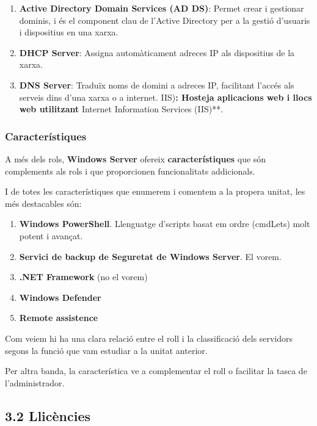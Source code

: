 \documentclass[
  a4paper,
]{article}
\begin{document}
\begin{enumerate}
\def\labelenumi{\arabic{enumi}.}
\item
  \textbf{Active Directory Domain Services (AD DS)}: Permet crear i
  gestionar dominis, i és el component clau de l'Active Directory per a
  la gestió d'usuaris i dispositius en una xarxa.
\item
  \textbf{DHCP Server}: Assigna automàticament adreces IP als
  dispositius de la xarxa.
\item
  \textbf{DNS Server}: Traduïx noms de domini a adreces IP, facilitant
  l'accés als serveis dins d'una xarxa o a internet. IIS)\textbf{:
  Hosteja aplicacions web i llocs web utilitzant }Internet Information
  Services (IIS)**.
\end{enumerate}

\subsubsection{Característiques}\label{caracteruxedstiques}

A més dels rols, \textbf{Windows Server} ofereix
\textbf{característiques} que són complements als rols i que
proporcionen funcionalitats addicionals.

I de totes les característiques que enumerem i comentem a la propera
unitat, les més destacables són:

\begin{enumerate}
\def\labelenumi{\arabic{enumi}.}
\item
  \textbf{Windows PowerShell}. Llenguatge d'scripts basat em ordre
  (cmdLets) molt potent i avançat.
\item
  \textbf{Servici de backup de Seguretat de Windows Server}. El vorem.
\item
  \textbf{.NET Framework} (no el vorem)
\item
  \textbf{Windows Defender}
\item
  \textbf{Remote assistence}
\end{enumerate}

Com veiem hi ha una clara relació entre el roll i la classificació dels
servidors segons la funció que vam estudiar a la unitat anterior.

Per altra banda, la característica ve a complementar el roll o facilitar
la tasca de l'administrador.

\subsection{3.2 Llicències}\label{llicuxe8ncies}
\end{document}
